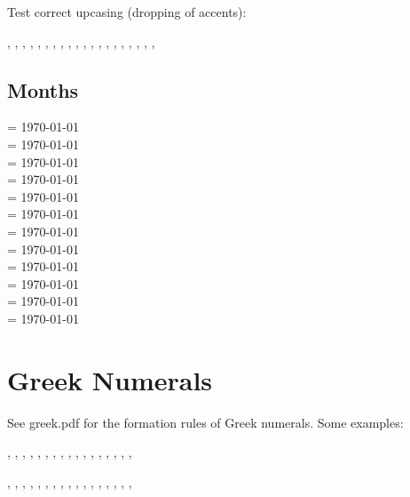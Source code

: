 \documentclass[a4paper]{article}
\begin{document}
Test correct upcasing (dropping of accents):

\MakeUppercase{
\prefacename,
\refname,
\abstractname,
\bibname,
\chaptername,
\appendixname,
\contentsname,
\listfigurename,
\listtablename,
\indexname,
\figurename,
\tablename,
\partname,
\enclname,
\ccname,
\headtoname,
\pagename,
\seename,
\alsoname,
\proofname,
\glossaryname
}


\subsection{Months}

 \month=\value{foo} \today \\
 \month=\value{foo} \today \\
 \month=\value{foo} \today \\
 \month=\value{foo} \today \\
 \month=\value{foo} \today \\
 \month=\value{foo} \today \\
 \month=\value{foo} \today \\
 \month=\value{foo} \today \\
 \month=\value{foo} \today \\
 \month=\value{foo} \today \\
 \month=\value{foo} \today \\
 \month=\value{foo} \today \\

\section{Greek Numerals}

See greek.pdf for the formation rules of Greek numerals.
Some examples:


,
,
,
,
,
,
,
,
,
,
,
,
,
,
,
,
,

,
,
,
,
,
,
,
,
,
,
,
,
,
,
,
,
,
\end{document}
